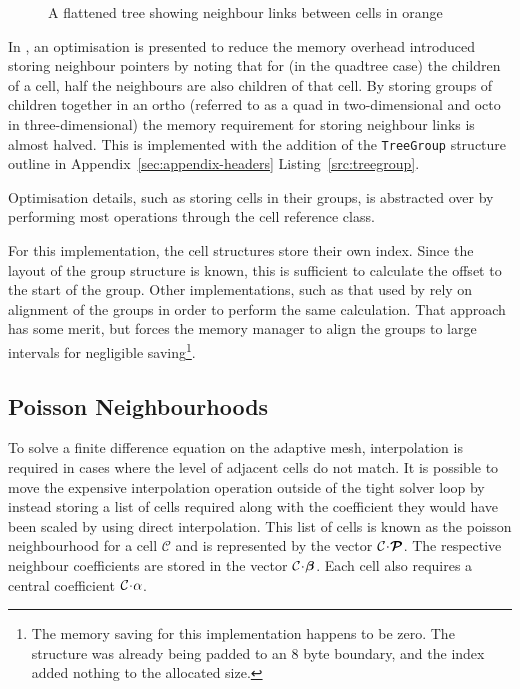 \documentclass[twoside]{IIBproject}
\newcommand{\vect} [1] {\bm{#1}}
\newcommand{\acc}{{\mkern 0.5mu\cdot\mkern 0.5mu}}
\numberwithin{figure}{section}
\begin{document}
        \begin{figure}[H]
            \centering
            
            \caption{A flattened tree showing neighbour links between cells in orange}
            \label{fig:ftt-neighbours}
        \end{figure}

        In \cite{Khokhlov98}, an optimisation is presented to reduce the memory overhead introduced storing neighbour pointers by noting that for (in the quadtree case) the children of a cell, half the neighbours are also children of that cell. By storing groups of children together in an ortho (referred to as a quad in two-dimensional and octo in three-dimensional) the memory requirement for storing neighbour links is almost halved. This is implemented with the addition of the \texttt{TreeGroup} structure outline in Appendix~\ref{sec:appendix-headers} Listing~\ref{src:treegroup}. 

        Optimisation details, such as storing cells in their groups, is abstracted over by performing most operations through the cell reference class. 

        For this implementation, the cell structures store their own index. Since the layout of the group structure is known, this is sufficient to calculate the offset to the start of the group. Other implementations, such as that used by \cite{Yung2010} rely on alignment of the groups in order to perform the same calculation. That approach has some merit, but forces the memory manager to align the groups to large intervals for negligible saving\footnote{The memory saving for this implementation happens to be zero. The structure was already being padded to an 8 byte boundary, and the index added nothing to the allocated size. }.






    \subsection{Poisson Neighbourhoods} %
        \label{sec:poissonneighbours}

        To solve a finite difference equation on the adaptive mesh, interpolation is required in cases where the level of adjacent cells do not match. It is possible to move the expensive interpolation operation outside of the tight solver loop by instead storing a list of cells required along with the coefficient they would have been scaled by using direct interpolation. This list of cells is known as the poisson neighbourhood for a cell $\mathcal{C}$ and is represented by the vector $\mathcal{C}\acc\vect{\mathcal{P}}$. The respective neighbour coefficients are stored in the vector $\mathcal{C}\acc\vect{\beta}$. Each cell also requires a central coefficient $\mathcal{C}\acc\alpha$.
\end{document}
